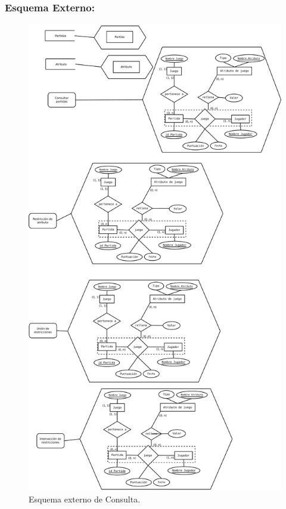 \subsubsection{Esquema Externo:}

\begin{figure}[h!]
	\centering
	\includegraphics[width=0.7\linewidth]{../Diagramas/pdf/EsquemaExternoConsulta.pdf}
	\caption{Esquema externo de Consulta.}
	
	\label{fig:EsquemaExtConsulta}
\end{figure}
